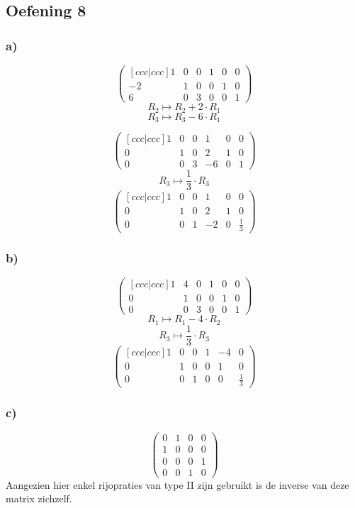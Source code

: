 \documentclass[lineaire_algebra_oplossingen.tex]{subfiles}
\begin{document}
\subsection{Oefening 8}
\subsubsection*{a)}
$$
\begin{pmatrix}[ccc|ccc]
 1 & 0 & 0 & 1 & 0 & 0\\
-2 & 1 & 0 & 0 & 1 & 0\\ 
 6 & 0 & 3 & 0 & 0 & 1 
\end{pmatrix}
$$
$$R_2 \longmapsto R_2 + 2\cdot R_1$$
$$R_3 \longmapsto R_3 - 6\cdot R_1$$

$$
\begin{pmatrix}[ccc|ccc]
 1 & 0 & 0 & 1 & 0 & 0\\
 0 & 1 & 0 & 2 & 1 & 0\\ 
 0 & 0 & 3 & -6 & 0 & 1 
\end{pmatrix}
$$
$$R_3 \longmapsto \frac{1}{3}\cdot R_3$$
$$
\begin{pmatrix}[ccc|ccc]
 1 & 0 & 0 & 1 & 0 & 0\\
 0 & 1 & 0 & 2 & 1 & 0\\ 
 0 & 0 & 1 & -2 & 0 & \frac{1}{3} 
\end{pmatrix}
$$
\subsubsection*{b)}

$$
\begin{pmatrix}[ccc|ccc]
1 & 4 & 0 & 1 & 0 & 0\\
0 & 1 & 0 & 0 & 1 & 0\\
0 & 0 & 3 & 0 & 0 & 1
\end{pmatrix}
$$
$$R_1 \longmapsto R_1 - 4\cdot R_2$$
$$R_3 \longmapsto \frac{1}{3}\cdot R_3$$
$$
\begin{pmatrix}[ccc|ccc]
1 & 0 & 0 & 1 & -4 & 0\\
0 & 1 & 0 & 0 & 1 & 0\\
0 & 0 & 1 & 0 & 0 & \frac{1}{3}
\end{pmatrix}
$$

\subsubsection*{c)}
$$
\begin{pmatrix}
0 & 1 & 0 & 0\\
1 & 0 & 0 & 0\\
0 & 0 & 0 & 1\\
0 & 0 & 1 & 0
\end{pmatrix}
$$
Aangezien hier enkel rijopraties van type II zijn gebruikt is de inverse van deze matrix zichzelf.
\end{document}
